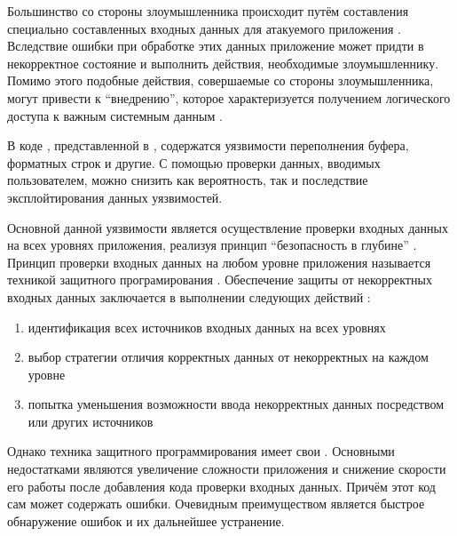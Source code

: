%
Большинство  со стороны злоумышленника происходит путём составления специально составленных входных данных для атакуемого приложения . 
%
Вследствие ошибки при обработке этих данных приложение может придти в некорректное состояние и выполнить действия, необходимые злоумышленнику. 
%
Помимо этого подобные действия, совершаемые со стороны злоумышленника, могут привести к ``внедрению'', которое характеризуется получением логического доступа к важным системным данным .

%
В коде , представленной в , содержатся уязвимости переполнения буфера, форматных строк и другие. 
%
С помощью проверки данных, вводимых пользователем, можно снизить как вероятность, так и последствие эксплойтирования данных уязвимостей. 

%
Основной  данной уязвимости является осуществление проверки входных данных на всех уровнях приложения, реализуя принцип ``безопасность в глубине'' . 
%
Принцип проверки входных данных на любом уровне приложения называется техникой защитного програмирования . 
%
Обеспечение защиты от некорректных входных данных заключается в выполнении следующих действий : 
\begin{enumerate}

	\item идентификация всех источников входных данных на всех уровнях 

	\item выбор стратегии отличия корректных данных от некорректных на каждом уровне 

	\item попытка уменьшения возможности ввода некорректных данных посредством  или других источников
\end{enumerate}

%
Однако техника защитного программирования имеет свои  . 
%
Основными недостатками являются увеличение сложности приложения и снижение скорости его работы после добавления кода проверки входных данных. 
%
Причём этот код сам может содержать ошибки. 
%
Очевидным преимуществом является быстрое обнаружение ошибок и их дальнейшее устранение.

